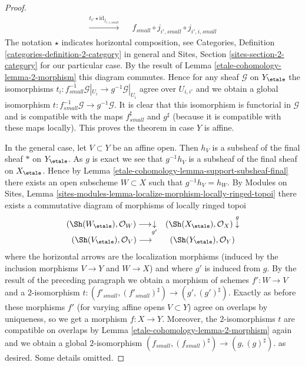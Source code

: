 \begin{proof}
$$\begin{array}{ccc}
\overset{t_{i'} \star \text{id}_{j_{i', i, small}}}{\longrightarrow} &  & f_{small} \circ j_{i', small} \circ j_{i', i, small}\end{array}
$$
The notation $\star$ indicates horizontal composition, see
Categories, Definition \ref{categories-definition-2-category}
in general and
Sites, Section \ref{sites-section-2-category}
for our particular case. By the result of
Lemma \ref{etale-cohomology-lemma-2-morphism}
this diagram commutes. Hence for any sheaf $\mathcal{G}$
on $Y_\etale$ the isomorphisms
$t_i : f_{small}^{-1}\mathcal{G}|_{U_i} \to g^{-1}\mathcal{G}|_{U_i}$
agree over $U_{i, i'}$ and we obtain a global isomorphism
$t : f_{small}^{-1}\mathcal{G} \to g^{-1}\mathcal{G}$.
It is clear that this isomorphism is functorial in $\mathcal{G}$
and is compatible with the maps $f_{small}^\sharp$ and $g^\sharp$
(because it is compatible with these maps locally).
This proves the theorem in case $Y$ is affine.

\medskip\noindent
In the general case, let $V \subset Y$ be an affine open.
Then $h_V$ is a subsheaf of the final sheaf $*$ on $Y_\etale$.
As $g$ is exact we see that $g^{-1}h_V$ is a subsheaf of the final
sheaf on $X_\etale$. Hence by
Lemma \ref{etale-cohomology-lemma-support-subsheaf-final}
there exists an open subscheme $W \subset X$ such that $g^{-1}h_V = h_W$. By
Modules on Sites,
Lemma \ref{sites-modules-lemma-localize-morphism-locally-ringed-topoi}
there exists a commutative diagram of morphisms of locally ringed
topoi
$$
\begin{array}{cc}(\Sh(W_\etale), \mathcal{O}_W) \longrightarrow\underset{g'}{\downarrow} & (\Sh(X_\etale), \mathcal{O}_X) \overset{g}{\downarrow} \\ (\Sh(V_\etale), \mathcal{O}_V) \longrightarrow & (\Sh(Y_\etale), \mathcal{O}_Y)\end{array}
$$
where the horizontal arrows are the localization morphisms
(induced by the inclusion morphisms $V \to Y$ and $W \to X$)
and where $g'$ is induced from $g$. By the result of the preceding
paragraph we obtain a morphism of schemes $f' : W \to V$ and
a $2$-isomorphism
$t : (f'_{small}, (f'_{small})^\sharp) \to (g', (g')^\sharp)$.
Exactly as before these morphisms $f'$ (for varying affine opens $V \subset Y$)
agree on overlaps by uniqueness, so we get a morphism $f : X \to Y$.
Moreover, the $2$-isomorphisms $t$ are compatible on overlaps by
Lemma \ref{etale-cohomology-lemma-2-morphism}
again and we obtain a global $2$-isomorphism
$(f_{small}, (f_{small})^\sharp) \to (g, (g)^\sharp)$.
as desired. Some details omitted.
\end{proof}

